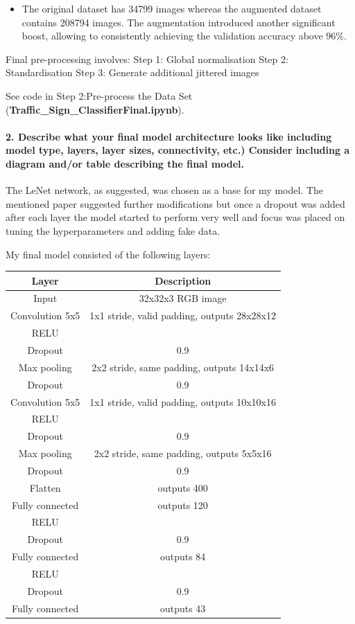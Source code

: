 \documentclass[11pt]{article}
\begin{document}
\begin{itemize}
\item
  The original dataset has 34799 images whereas the augmented dataset
  contains 208794 images. The augmentation introduced another
  significant boost, allowing to consistently achieving the validation
  accuracy above 96\%.
\end{itemize}

Final pre-processing involves: Step 1: Global normalisation Step 2:
Standardisation Step 3: Generate additional jittered images

See code in Step 2:Pre-process the Data Set
(\textbf{Traffic\_Sign\_ClassifierFinal.ipynb}).

\hypertarget{describe-what-your-final-model-architecture-looks-like-including-model-type-layers-layer-sizes-connectivity-etc.-consider-including-a-diagram-andor-table-describing-the-final-model.}{%
\paragraph{2. Describe what your final model architecture looks like
including model type, layers, layer sizes, connectivity, etc.) Consider
including a diagram and/or table describing the final
model.}\label{describe-what-your-final-model-architecture-looks-like-including-model-type-layers-layer-sizes-connectivity-etc.-consider-including-a-diagram-andor-table-describing-the-final-model.}}

The LeNet network, as suggested, was chosen as a base for my model. The
mentioned paper suggested further modifications but once a dropout was
added after each layer the model started to perform very well and focus
was placed on tuning the hyperparameters and adding fake data.

My final model consisted of the following layers:

\begin{longtable}[]{@{}cc@{}}
\toprule
Layer & Description\tabularnewline
\midrule
\endhead
Input & 32x32x3 RGB image\tabularnewline
Convolution 5x5 & 1x1 stride, valid padding, outputs
28x28x12\tabularnewline
RELU &\tabularnewline
Dropout & 0.9\tabularnewline
Max pooling & 2x2 stride, same padding, outputs 14x14x6\tabularnewline
Dropout & 0.9\tabularnewline
Convolution 5x5 & 1x1 stride, valid padding, outputs
10x10x16\tabularnewline
RELU &\tabularnewline
Dropout & 0.9\tabularnewline
Max pooling & 2x2 stride, same padding, outputs 5x5x16\tabularnewline
Dropout & 0.9\tabularnewline
Flatten & outputs 400\tabularnewline
Fully connected & outputs 120\tabularnewline
RELU &\tabularnewline
Dropout & 0.9\tabularnewline
Fully connected & outputs 84\tabularnewline
RELU &\tabularnewline
Dropout & 0.9\tabularnewline
Fully connected & outputs 43\tabularnewline
\bottomrule
\end{longtable}
\end{document}
